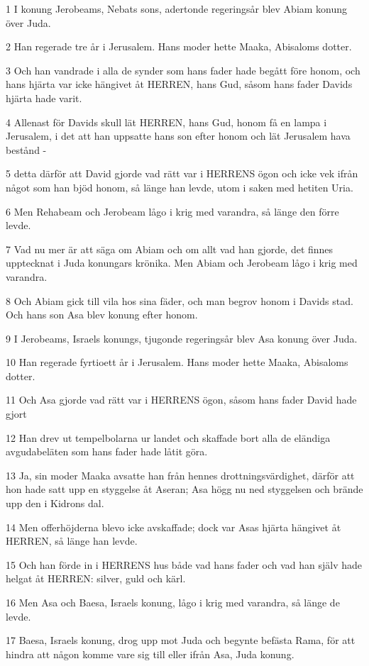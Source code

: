 \par 1 I konung Jerobeams, Nebats sons, adertonde regeringsår blev Abiam konung över Juda.
\par 2 Han regerade tre år i Jerusalem. Hans moder hette Maaka, Abisaloms dotter.
\par 3 Och han vandrade i alla de synder som hans fader hade begått före honom, och hans hjärta var icke hängivet åt HERREN, hans Gud, såsom hans fader Davids hjärta hade varit.
\par 4 Allenast för Davids skull lät HERREN, hans Gud, honom få en lampa i Jerusalem, i det att han uppsatte hans son efter honom och lät Jerusalem hava bestånd -
\par 5 detta därför att David gjorde vad rätt var i HERRENS ögon och icke vek ifrån något som han bjöd honom, så länge han levde, utom i saken med hetiten Uria.
\par 6 Men Rehabeam och Jerobeam lågo i krig med varandra, så länge den förre levde.
\par 7 Vad nu mer är att säga om Abiam och om allt vad han gjorde, det finnes upptecknat i Juda konungars krönika. Men Abiam och Jerobeam lågo i krig med varandra.
\par 8 Och Abiam gick till vila hos sina fäder, och man begrov honom i Davids stad. Och hans son Asa blev konung efter honom.
\par 9 I Jerobeams, Israels konungs, tjugonde regeringsår blev Asa konung över Juda.
\par 10 Han regerade fyrtioett år i Jerusalem. Hans moder hette Maaka, Abisaloms dotter.
\par 11 Och Asa gjorde vad rätt var i HERRENS ögon, såsom hans fader David hade gjort
\par 12 Han drev ut tempelbolarna ur landet och skaffade bort alla de eländiga avgudabeläten som hans fader hade låtit göra.
\par 13 Ja, sin moder Maaka avsatte han från hennes drottningsvärdighet, därför att hon hade satt upp en styggelse åt Aseran; Asa högg nu ned styggelsen och brände upp den i Kidrons dal.
\par 14 Men offerhöjderna blevo icke avskaffade; dock var Asas hjärta hängivet åt HERREN, så länge han levde.
\par 15 Och han förde in i HERRENS hus både vad hans fader och vad han själv hade helgat åt HERREN: silver, guld och kärl.
\par 16 Men Asa och Baesa, Israels konung, lågo i krig med varandra, så länge de levde.
\par 17 Baesa, Israels konung, drog upp mot Juda och begynte befästa Rama, för att hindra att någon komme vare sig till eller ifrån Asa, Juda konung.
